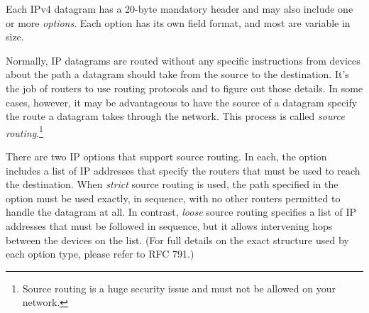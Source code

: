 \begin{keyconcept}
Each IPv4 datagram has a 20-byte mandatory header and may also include one or more \emph{options}.
Each option has its own field format, and most are variable in size.
\end{keyconcept}

Normally, IP datagrams are routed without any specific instructions from devices about the path a datagram should take from the source to the destination.
It's the job of routers to use routing protocols and to figure out those details.
In some cases, however, it may be advantageous to have the source of a datagram specify the route a datagram takes through the network.
This process is called \emph{source routing}.\footnote{Source routing is a huge security issue and must not be allowed on your network.}

There are two IP options that support source routing.
In each, the option includes a list of IP addresses that specify the routers that must be used to reach the destination.
When \emph{strict} source routing is used, the path specified in the option must be used exactly, in sequence,
with no other routers permitted to handle the datagram at all.
In contrast, \emph{loose} source routing specifies a list of IP addresses that must be followed in sequence,
but it allows intervening hops between the devices on the list.
(For full details on the exact structure used by each option type, please refer to RFC 791.)
